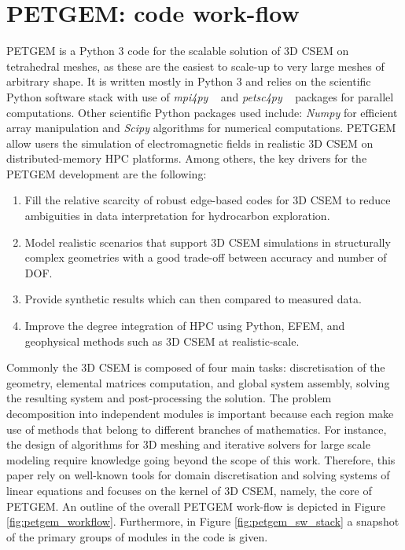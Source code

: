 \documentclass[review]{elsarticle}
\begin{document}
\section{PETGEM: code work-flow}
\label{Petgem_workflow}
PETGEM is a Python 3 code for the scalable solution of 3D CSEM on tetrahedral meshes, as these are the easiest to scale-up to very large meshes of arbitrary shape. It is written mostly in Python 3 and relies on the scientific Python software stack with use of \textit{mpi4py} ~\citep{Dalcin2011} and \textit{petsc4py} ~\citep{Dalcin2011} packages for parallel computations. Other scientific Python packages used include: \textit{Numpy} for efficient array manipulation and \textit{Scipy} algorithms for numerical computations. PETGEM allow users the simulation of electromagnetic fields in realistic 3D CSEM on distributed-memory HPC platforms. Among others, the key drivers for the PETGEM development are the following:
\begin{enumerate}
\item Fill the relative scarcity of robust edge-based codes for 3D CSEM to reduce ambiguities in data interpretation for hydrocarbon exploration.
\item Model realistic scenarios that support 3D CSEM simulations in structurally complex geometries with a good trade-off between accuracy and number of DOF.
\item Provide synthetic results which can then compared to measured data.
\item Improve the degree integration of HPC using Python, EFEM, and geophysical methods such as 3D CSEM at realistic-scale.
\end{enumerate}
Commonly the 3D CSEM is composed of four main tasks: discretisation of the geometry, elemental matrices computation, and global system assembly, solving the resulting system and post-processing the solution. The problem decomposition into independent modules is important because each region make use of methods that belong to different branches of mathematics. For instance, the design of algorithms for 3D meshing and iterative solvers for large scale modeling require knowledge going beyond the scope of this work. Therefore, this paper rely on well-known tools for domain discretisation and solving systems of linear equations and focuses on the kernel of 3D CSEM, namely, the core of PETGEM. An outline of the overall PETGEM work-flow is depicted in Figure \ref{fig:petgem_workflow}. Furthermore, in Figure \ref{fig:petgem_sw_stack} a snapshot of the primary groups of modules in the code is given. 
\end{document}
